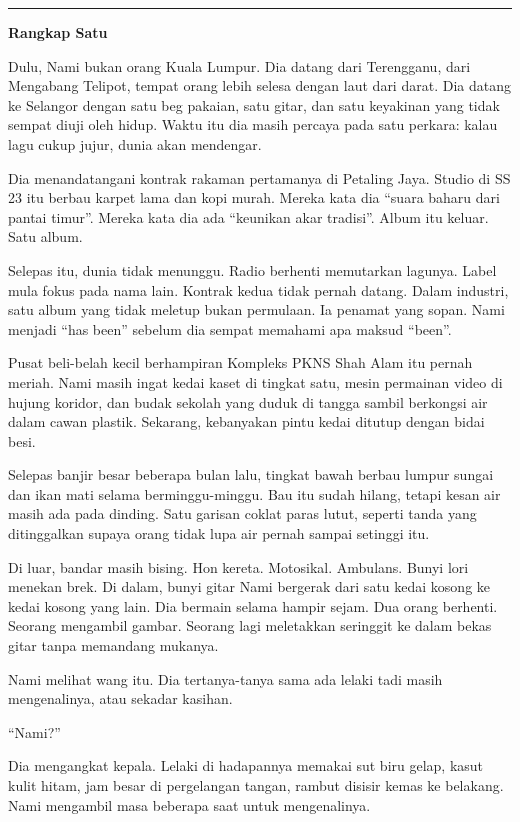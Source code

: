 \documentclass[
  11pt,
  a5paper,
  openany,
  oneside]{book}
\begin{document}
\begin{center}\rule{0.5\linewidth}{0.5pt}\end{center}

\textbf{Rangkap Satu}

Dulu, Nami bukan orang Kuala Lumpur. Dia datang dari Terengganu, dari
Mengabang Telipot, tempat orang lebih selesa dengan laut dari darat. Dia
datang ke Selangor dengan satu beg pakaian, satu gitar, dan satu
keyakinan yang tidak sempat diuji oleh hidup. Waktu itu dia masih
percaya pada satu perkara: kalau lagu cukup jujur, dunia akan mendengar.

Dia menandatangani kontrak rakaman pertamanya di Petaling Jaya. Studio
di SS 23 itu berbau karpet lama dan kopi murah. Mereka kata dia ``suara
baharu dari pantai timur''. Mereka kata dia ada ``keunikan akar
tradisi''. Album itu keluar. Satu album.

Selepas itu, dunia tidak menunggu. Radio berhenti memutarkan lagunya.
Label mula fokus pada nama lain. Kontrak kedua tidak pernah datang.
Dalam industri, satu album yang tidak meletup bukan permulaan. Ia
penamat yang sopan. Nami menjadi ``has been'' sebelum dia sempat
memahami apa maksud ``been''.

Pusat beli-belah kecil berhampiran Kompleks PKNS Shah Alam itu pernah
meriah. Nami masih ingat kedai kaset di tingkat satu, mesin permainan
video di hujung koridor, dan budak sekolah yang duduk di tangga sambil
berkongsi air dalam cawan plastik. Sekarang, kebanyakan pintu kedai
ditutup dengan bidai besi.

Selepas banjir besar beberapa bulan lalu, tingkat bawah berbau lumpur
sungai dan ikan mati selama berminggu-minggu. Bau itu sudah hilang,
tetapi kesan air masih ada pada dinding. Satu garisan coklat paras
lutut, seperti tanda yang ditinggalkan supaya orang tidak lupa air
pernah sampai setinggi itu.

Di luar, bandar masih bising. Hon kereta. Motosikal. Ambulans. Bunyi
lori menekan brek. Di dalam, bunyi gitar Nami bergerak dari satu kedai
kosong ke kedai kosong yang lain. Dia bermain selama hampir sejam. Dua
orang berhenti. Seorang mengambil gambar. Seorang lagi meletakkan
seringgit ke dalam bekas gitar tanpa memandang mukanya.

Nami melihat wang itu. Dia tertanya-tanya sama ada lelaki tadi masih
mengenalinya, atau sekadar kasihan.

``Nami?''

Dia mengangkat kepala. Lelaki di hadapannya memakai sut biru gelap,
kasut kulit hitam, jam besar di pergelangan tangan, rambut disisir kemas
ke belakang. Nami mengambil masa beberapa saat untuk mengenalinya.
\end{document}
